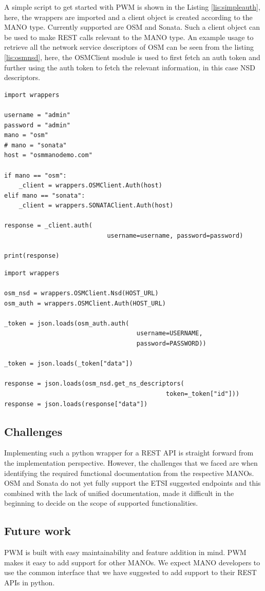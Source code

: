 A simple script to get started with PWM is shown in the Listing \ref{lis:simpleauth}, here, the wrappers are imported and a client object is created according to the MANO type. 
Currently supported are OSM and Sonata. 
Such a client object can be used to make REST calls relevant to the MANO type. 
An example usage to retrieve all the network service descriptors of OSM can be seen from the listing \ref{lis:osmnsd}, here, the OSMClient module is used to first fetch an auth token and further using the auth token to fetch the relevant information, in this case NSD descriptors.


\begin{lstlisting}[caption=Simple wrapper code to fetch token, label=lis:simpleauth]
import wrappers

username = "admin"
password = "admin"
mano = "osm"
# mano = "sonata"
host = "osmmanodemo.com"

if mano == "osm":
	_client = wrappers.OSMClient.Auth(host)
elif mano == "sonata":
	_client = wrappers.SONATAClient.Auth(host)

response = _client.auth(
							username=username, password=password)

print(response)

\end{lstlisting}

\begin{lstlisting}[caption=Code to fetch all NSDs in OSM, label=lis:osmnsd]
import wrappers

osm_nsd = wrappers.OSMClient.Nsd(HOST_URL)
osm_auth = wrappers.OSMClient.Auth(HOST_URL)

_token = json.loads(osm_auth.auth(
									username=USERNAME,
									password=PASSWORD))

_token = json.loads(_token["data"])

response = json.loads(osm_nsd.get_ns_descriptors(
											token=_token["id"]))
response = json.loads(response["data"])
\end{lstlisting}

\subsection{Challenges}

Implementing such a python wrapper for a REST API is straight forward from the implementation perspective. 
However, the challenges that we faced are when identifying the required functional documentation from the respective MANOs. 
OSM and Sonata do not yet fully support the ETSI suggested endpoints and this combined with the lack of unified documentation, made it difficult in the beginning to decide on the scope of supported functionalities.\\
  

\subsection{Future work}

PWM is built with easy maintainability and feature addition in mind. 
PWM makes it easy to add support for other MANOs. 
We expect MANO developers to use the common interface that we have suggested to add support to their REST APIs in python.

 
